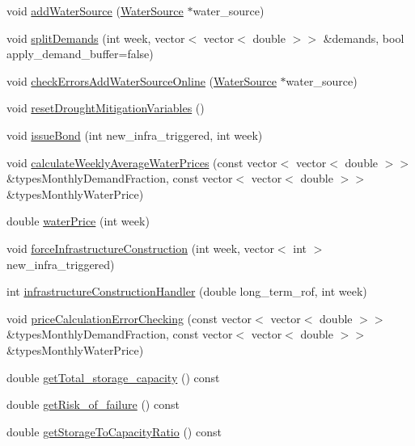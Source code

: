 \begin{DoxyCompactItemize}
\item 
void \mbox{\hyperlink{classUtility_aebbfd65c13e86cfeda8bdfbcc6712587}{add\+Water\+Source}} (\mbox{\hyperlink{classWaterSource}{Water\+Source}} $\ast$water\+\_\+source)
\item 
void \mbox{\hyperlink{classUtility_ab578bbe9f346692d9251418f20fd2345}{split\+Demands}} (int week, vector$<$ vector$<$ double $>$$>$ \&demands, bool apply\+\_\+demand\+\_\+buffer=false)
\item 
void \mbox{\hyperlink{classUtility_a0674d7d95f4d6595f7e01817a4d84a98}{check\+Errors\+Add\+Water\+Source\+Online}} (\mbox{\hyperlink{classWaterSource}{Water\+Source}} $\ast$water\+\_\+source)
\item 
void \mbox{\hyperlink{classUtility_af9ec9c2cb69166db021f03ce9ddf4d8e}{reset\+Drought\+Mitigation\+Variables}} ()
\item 
void \mbox{\hyperlink{classUtility_a152ceea2917ea7715e8fbf8aff24390f}{issue\+Bond}} (int new\+\_\+infra\+\_\+triggered, int week)
\item 
void \mbox{\hyperlink{classUtility_a0189edb631c9596f094b15afeeb934fd}{calculate\+Weekly\+Average\+Water\+Prices}} (const vector$<$ vector$<$ double $>$$>$ \&types\+Monthly\+Demand\+Fraction, const vector$<$ vector$<$ double $>$$>$ \&types\+Monthly\+Water\+Price)
\item 
double \mbox{\hyperlink{classUtility_a0dca2586b9ed761cdab3b0a344daf21c}{water\+Price}} (int week)
\item 
void \mbox{\hyperlink{classUtility_a7daa5b948a370eca83bc8c63890f6b19}{force\+Infrastructure\+Construction}} (int week, vector$<$ int $>$ new\+\_\+infra\+\_\+triggered)
\item 
int \mbox{\hyperlink{classUtility_ae93114986578d3d3fbae56f271ac7df6}{infrastructure\+Construction\+Handler}} (double long\+\_\+term\+\_\+rof, int week)
\item 
void \mbox{\hyperlink{classUtility_a01ec91140b9d23bf5b03e0fc55bced0d}{price\+Calculation\+Error\+Checking}} (const vector$<$ vector$<$ double $>$$>$ \&types\+Monthly\+Demand\+Fraction, const vector$<$ vector$<$ double $>$$>$ \&types\+Monthly\+Water\+Price)
\item 
double \mbox{\hyperlink{classUtility_a16f8269dc5f80c1d079c49f33495f620}{get\+Total\+\_\+storage\+\_\+capacity}} () const
\item 
double \mbox{\hyperlink{classUtility_ab43bfbf7db1b5dc2e554a584b19f9e3c}{get\+Risk\+\_\+of\+\_\+failure}} () const
\item 
double \mbox{\hyperlink{classUtility_a0e27f2877c780e214c6dda06d03246fe}{get\+Storage\+To\+Capacity\+Ratio}} () const
$$
\end{DoxyCompactItemize}
